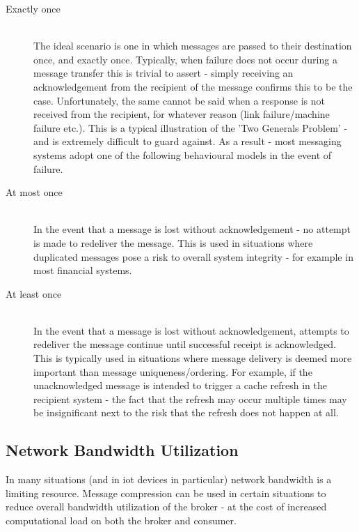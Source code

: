 \begin{description}
  \item[Exactly once] \hfill \\
    The ideal scenario is one in which messages are passed to their destination
    once, and exactly once. Typically, when failure does not occur during a
    message transfer this is trivial to assert - simply receiving an acknowledgement
    from the recipient of the message confirms this to be the case.
    Unfortunately, the same cannot be said when a response is not received from
    the recipient, for whatever reason (link failure/machine failure etc.).
    This is a typical illustration of the
    'Two Generals Problem'\cite{Gray:1978:NDB:647433.723863} - and is extremely
    difficult to guard against. As a result - most messaging systems adopt one
    of the following behavioural models in the event of failure.
  \item[At most once] \hfill \\
    In the event that a message is lost without acknowledgement - no attempt is made
    to redeliver the message. This is used in situations where duplicated messages
    pose a risk to overall system integrity - for example in most financial systems.
  \item[At least once] \hfill \\
    In the event that a message is lost without acknowledgement, attempts to
    redeliver the message continue until successful receipt is acknowledged.
    This is typically used in situations where message delivery is deemed more
    important than message uniqueness/ordering. For example, if the unacknowledged
    message is intended to trigger a cache refresh in the recipient system - the
    fact that the refresh may occur multiple times may be insignificant next to
    the risk that the refresh does not happen at all.
\end{description}

\subsection{Network Bandwidth Utilization}
\label{sub:Network Bandwidth Utilization}

In many situations (and in \gls{iot} devices in particular) network bandwidth is
a limiting resource. Message compression can be used in certain situations to
reduce overall bandwidth utilization of the broker - at the cost of increased
computational load on both the broker and consumer.

